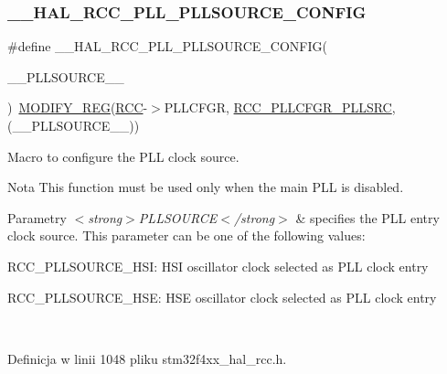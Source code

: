\subsubsection{\texorpdfstring{\+\_\+\+\_\+\+H\+A\+L\+\_\+\+R\+C\+C\+\_\+\+P\+L\+L\+\_\+\+P\+L\+L\+S\+O\+U\+R\+C\+E\+\_\+\+C\+O\+N\+F\+IG}{\_\_HAL\_RCC\_PLL\_PLLSOURCE\_CONFIG}}
{\footnotesize\ttfamily \#define \+\_\+\+\_\+\+H\+A\+L\+\_\+\+R\+C\+C\+\_\+\+P\+L\+L\+\_\+\+P\+L\+L\+S\+O\+U\+R\+C\+E\+\_\+\+C\+O\+N\+F\+IG(\begin{DoxyParamCaption}\item[{}]{\+\_\+\+\_\+\+P\+L\+L\+S\+O\+U\+R\+C\+E\+\_\+\+\_\+ }\end{DoxyParamCaption})~\hyperlink{group___exported__macro_ga6553c99f510c3bab8cc0a91602053247}{M\+O\+D\+I\+F\+Y\+\_\+\+R\+EG}(\hyperlink{group___peripheral__declaration_ga74944438a086975793d26ae48d5882d4}{R\+CC}-\/$>$P\+L\+L\+C\+F\+GR, \hyperlink{group___peripheral___registers___bits___definition_ga92cb53ea81d2c47537eb217cc6659a2e}{R\+C\+C\+\_\+\+P\+L\+L\+C\+F\+G\+R\+\_\+\+P\+L\+L\+S\+RC}, (\+\_\+\+\_\+\+P\+L\+L\+S\+O\+U\+R\+C\+E\+\_\+\+\_\+))}



Macro to configure the P\+LL clock source. 

\begin{DoxyNote}{Nota}
This function must be used only when the main P\+LL is disabled. 
\end{DoxyNote}

\begin{DoxyParams}{Parametry}
{\em $<$strong$>$\+P\+L\+L\+S\+O\+U\+R\+C\+E$<$/strong$>$} & specifies the P\+LL entry clock source. This parameter can be one of the following values\+: \begin{DoxyItemize}
\item R\+C\+C\+\_\+\+P\+L\+L\+S\+O\+U\+R\+C\+E\+\_\+\+H\+SI\+: H\+SI oscillator clock selected as P\+LL clock entry \item R\+C\+C\+\_\+\+P\+L\+L\+S\+O\+U\+R\+C\+E\+\_\+\+H\+SE\+: H\+SE oscillator clock selected as P\+LL clock entry \end{DoxyItemize}
\\
\hline
\end{DoxyParams}


Definicja w linii 1048 pliku stm32f4xx\+\_\+hal\+\_\+rcc.\+h.

